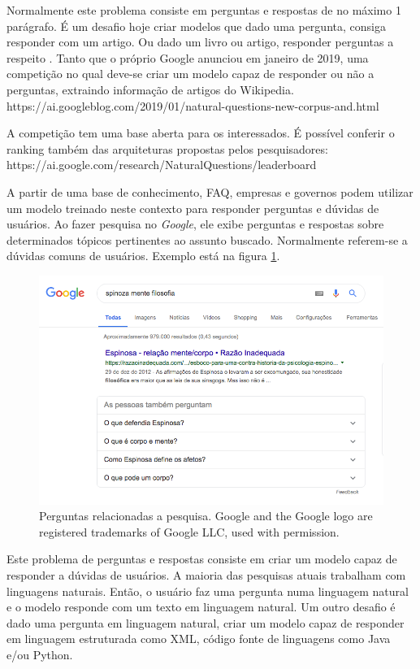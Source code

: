 Normalmente este problema consiste em perguntas e respostas de no máximo 1 parágrafo. É um desafio hoje criar modelos que dado uma pergunta, consiga responder com um artigo. Ou dado um livro ou artigo, responder perguntas a respeito . Tanto que o próprio Google anunciou em janeiro de 2019, uma competição no qual deve-se criar um modelo capaz de responder ou não a perguntas, extraindo informação de artigos do Wikipedia. https://ai.googleblog.com/2019/01/natural-questions-new-corpus-and.html

A competição tem uma base aberta para os interessados. É possível conferir o ranking também das arquiteturas propostas pelos pesquisadores: https://ai.google.com/research/NaturalQuestions/leaderboard


A partir de uma base de conhecimento, FAQ, empresas e governos podem utilizar um modelo treinado neste contexto para responder perguntas e dúvidas de usuários. Ao fazer pesquisa no \textit{Google}, ele exibe perguntas e respostas sobre determinados tópicos pertinentes ao assunto buscado. Normalmente referem-se a dúvidas comuns de usuários. Exemplo está na figura \ref{fig:busca-google}.

\begin{figure}[h]
\includegraphics[width=12cm]{src/figuras/cap-introducao/busca-google-pergunta-resposta.png}
\caption{Perguntas relacionadas a pesquisa. Google and the Google logo are registered trademarks of Google LLC, used with permission.}
\label{fig:busca-google}
\end{figure}

Este problema de perguntas e respostas consiste em criar um modelo capaz de responder a dúvidas de usuários. A maioria das pesquisas atuais trabalham com linguagens naturais. Então, o usuário faz uma pergunta numa linguagem natural e o modelo responde com um texto em linguagem natural. Um outro desafio é dado uma pergunta em linguagem natural, criar um modelo capaz de responder em linguagem estruturada como XML, código fonte de linguagens como Java e/ou Python.

